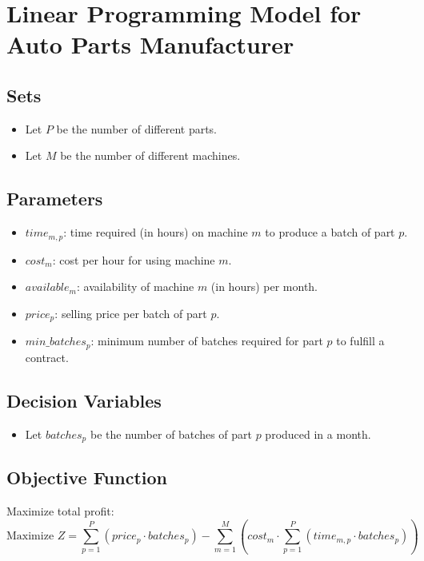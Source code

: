 \documentclass{article}
\begin{document}
\section*{Linear Programming Model for Auto Parts Manufacturer}

\subsection*{Sets}
\begin{itemize}
    \item Let \( P \) be the number of different parts.
    \item Let \( M \) be the number of different machines.
\end{itemize}

\subsection*{Parameters}
\begin{itemize}
    \item \( time_{m,p} \): time required (in hours) on machine \( m \) to produce a batch of part \( p \).
    \item \( cost_{m} \): cost per hour for using machine \( m \).
    \item \( available_{m} \): availability of machine \( m \) (in hours) per month.
    \item \( price_{p} \): selling price per batch of part \( p \).
    \item \( min\_batches_{p} \): minimum number of batches required for part \( p \) to fulfill a contract.
\end{itemize}

\subsection*{Decision Variables}
\begin{itemize}
    \item Let \( batches_{p} \) be the number of batches of part \( p \) produced in a month.
\end{itemize}

\subsection*{Objective Function}
Maximize total profit:
\[
\text{Maximize } Z = \sum_{p=1}^{P} (price_{p} \cdot batches_{p}) - \sum_{m=1}^{M} \left( cost_{m} \cdot \sum_{p=1}^{P} (time_{m,p} \cdot batches_{p}) \right)
\]
\end{document}
